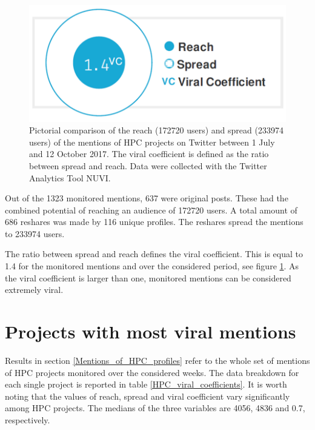 \begin{figure}[!t] 
 \begin{center}
 \includegraphics[scale=0.3]{Images/HPC_viral_coefficient.png}
 \caption{Pictorial comparison of the reach (172720 users) and spread (233974 users) of the mentions of HPC projects on Twitter between 1 July and 12 October 2017. The viral coefficient is defined as the ratio between spread and reach. Data were collected with the Twitter Analytics Tool NUVI.}
 \label{HPC_viral_coefficient}
 \end{center}
\end{figure}

Out of the 1323 monitored mentions, 637 were original posts. These had the combined potential of reaching an audience of 172720 users. A total amount of 686 reshares was made by 116 unique profiles. The reshares spread the mentions to 233974 users. 

The ratio between spread and reach defines the viral coefficient. This is equal to 1.4 for the monitored mentions and over the considered period, see figure \ref{HPC_viral_coefficient}. As the viral coefficient is larger than one, monitored mentions can be considered extremely viral. 

\section{Projects with most viral mentions} \label{Projects_with_most_viral_mentions}
Results in section \ref{Mentions_of_HPC_profiles} refer to the whole set of mentions of HPC projects monitored over the considered weeks. The data breakdown for each single project is reported in table \ref{HPC_viral_coefficients}. It is worth noting that the values of reach, spread and viral coefficient vary significantly among HPC projects. The medians of the three variables are 4056, 4836 and 0.7, respectively.     
 
